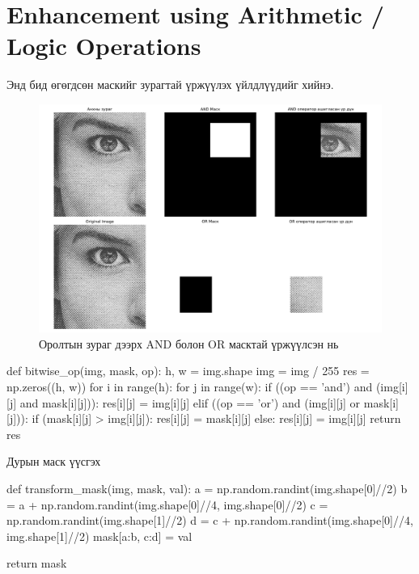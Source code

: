 \documentclass[a4paper]{article}
\begin{document}
\section{Enhancement using Arithmetic / Logic Operations}
Энд бид өгөгдсөн маскийг зурагтай үржүүлэх үйлдлүүдийг хийнэ.
\begin{figure}[H]
  \centering
  \includegraphics[scale = 0.30]{enhancement_arithmetics_1.png}
  \caption[Intensity 1]{Оролтын зураг дээрх AND болон OR масктай үржүүлсэн нь}
\end{figure}
\begin{python}
def bitwise_op(img, mask, op):
    h, w = img.shape
    img = img / 255
    res = np.zeros((h, w))
    for i in range(h):
        for j in range(w):
            if ((op == 'and') and (img[i][j] and mask[i][j])):
                res[i][j] = img[i][j]
            elif ((op == 'or') and (img[i][j] or mask[i][j])):
                if (mask[i][j] > img[i][j]):
                    res[i][j] = mask[i][j]
                else:
                    res[i][j] = img[i][j]
    return res
\end{python} \hfill \break
Дурын маск үүсгэх
\begin{python}
def transform_mask(img, mask, val):
    a = np.random.randint(img.shape[0]//2)
    b = a + np.random.randint(img.shape[0]//4, img.shape[0]//2)
    c = np.random.randint(img.shape[1]//2)
    d = c + np.random.randint(img.shape[0]//4, img.shape[1]//2)
    mask[a:b, c:d] = val

    return mask
\end{python} \hfill \break
\end{document}
